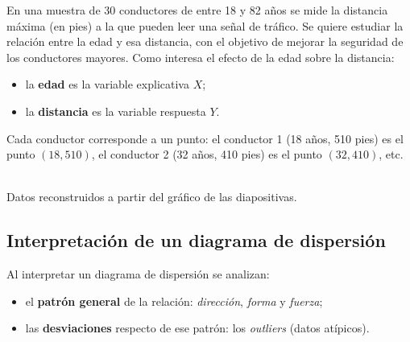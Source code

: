 \begin{ejemplo}
  En una muestra de 30 conductores de entre 18 y 82 años se mide la distancia máxima (en pies)
  a la que pueden leer una señal de tráfico. Se quiere estudiar la relación entre la edad y esa
  distancia, con el objetivo de mejorar la seguridad de los conductores mayores. Como interesa
  el efecto de la edad sobre la distancia:
  \begin{itemize}
    \item la \textbf{edad} es la variable explicativa $X$;
    \item la \textbf{distancia} es la variable respuesta $Y$.
  \end{itemize}
  Cada conductor corresponde a un punto: el conductor 1 (18 años, 510 pies) es el punto
  $(18,510)$, el conductor 2 (32 años, 410 pies) es el punto $(32,410)$, etc.

  \begin{center}
    \\
    {\footnotesize Datos reconstruidos a partir del gráfico de las diapositivas.}
  \end{center}
\end{ejemplo}

\subsection{Interpretación de un diagrama de dispersión}

Al interpretar un diagrama de dispersión se analizan:
\begin{itemize}
  \item el \textbf{patrón general} de la relación: \emph{dirección}, \emph{forma} y
    \emph{fuerza};
  \item las \textbf{desviaciones} respecto de ese patrón: los \emph{outliers} (datos atípicos).
\end{itemize}


